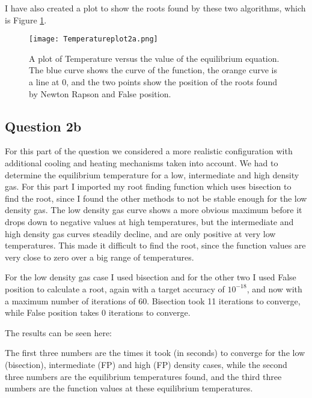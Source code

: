 I have also created a plot to show the roots found by these two algorithms, which is Figure \ref{fig:Temp}.

\begin{figure}[h!]
  \centering
  \texttt{[image: Temperatureplot2a.png]}
  \caption{A plot of Temperature versus the value of the equilibrium equation. The blue curve shows the curve of the function, the orange curve is a line at 0, and the two points show the position of the roots found by Newton Rapson and False position.}
  \label{fig:Temp}
\end{figure}

\subsection{Question 2b}

For this part of the question we considered a more realistic configuration with additional cooling and heating mechanisms taken into account.
We had to determine the equilibrium temperature for a low, intermediate and high density gas. 
For this part I imported my root finding function which uses bisection to find the root, since I found the other methods to not be stable enough for the low density gas.
The low density gas curve shows a more obvious maximum before it drops down to negative values at high temperatures, but the intermediate and high density gas curves steadily decline, and are only positive at very low temperatures.
This made it difficult to find the root, since the function values are very close to zero over a big range of temperatures.

For the low density gas case I used bisection and for the other two I used False position to calculate a root, again with a target accuracy of $10^{-18}$, and now with a maximum number of iterations of 60.
Bisection took 11 iterations to converge, while False position takes 0 iterations to converge.

The results can be seen here:



The first three numbers are the times it took (in seconds) to converge for the low (bisection), intermediate (FP) and high (FP) density cases, while the second three numbers are the equilibrium temperatures found, and the third three numbers are the function values at these equilibrium temperatures.







